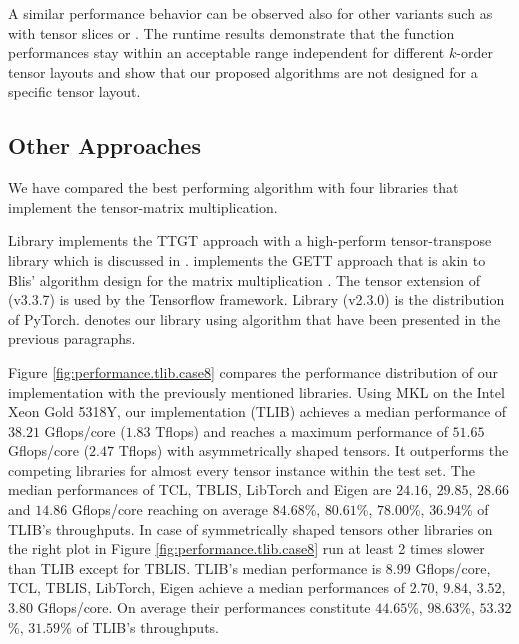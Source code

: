 A similar performance behavior can be observed also for other  variants such as  with tensor slices or .
The runtime results demonstrate that the function performances stay within an acceptable range independent for different $k$-order tensor layouts and show that our proposed algorithms are not designed for a specific tensor layout.

\subsection{Other Approaches}
We have compared the best performing algorithm with four libraries that implement the tensor-matrix multiplication.

Library  implements the TTGT approach with a high-perform tensor-transpose library  which is discussed in \cite{springer:2018:design}.
 implements the GETT approach that is akin to Blis' algorithm design for the matrix multiplication \cite{matthews:2018:high}.
The tensor extension of  (v3.3.7) is used by the Tensorflow framework.
Library  (v2.3.0) is the  distribution of PyTorch.
 denotes our library using algorithm  that have been presented in the previous paragraphs.

Figure \ref{fig:performance.tlib.case8} compares the performance distribution of our implementation with the previously mentioned libraries.
Using MKL on the Intel Xeon Gold 5318Y, our implementation (TLIB) achieves a median performance of $38.21$ Gflops/core ($1.83$ Tflops) and reaches a maximum performance of $51.65$ Gflops/core ($2.47$ Tflops) with asymmetrically shaped tensors.
It outperforms the competing libraries for almost every tensor instance within the test set.
The median performances of TCL, TBLIS, LibTorch and Eigen are $24.16$, $29.85$, $28.66$ and $14.86$ Gflops/core reaching on average $84.68$\%, $80.61$\%, $78.00$\%, $36.94$\% of TLIB's throughputs.
In case of symmetrically shaped tensors other libraries on the right plot in Figure \ref{fig:performance.tlib.case8} run at least 2 times slower than TLIB except for TBLIS.
TLIB's median performance is $8.99$ Gflops/core, TCL, TBLIS, LibTorch, Eigen achieve a median performances of $2.70$, $9.84$, $3.52$, $3.80$ Gflops/core.
On average their performances constitute $44.65$\%, $98.63$\%, $53.32$\%, $31.59$\% of TLIB's throughputs.

